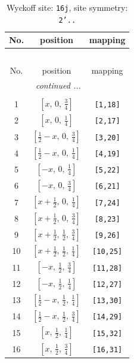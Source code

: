 \documentclass[fleqn,8pt]{jsarticle}
\begin{document}
\renewcommand{\arraystretch}{1.2}
\begin{longtable}{ccc}
\caption{Wyckoff site: {\tt 16j}, site symmetry: {\tt 2'..}}
 \\
 \hline \hline
No. & position & mapping \\ \hline \endfirsthead

\multicolumn{2}{l}{\tablename\ \thetable{}} \\
 \hline \hline
No. & position & mapping \\ \hline \endhead

 \hline \hline
\multicolumn{2}{r}{\footnotesize\it continued ...} \\ \endfoot

 \hline \hline
\multicolumn{2}{r}{} \\ \endlastfoot

1 & $\left[ x,\, 0,\, \frac{3}{4} \right]$ & {\tt [1,18]} \\ \hline
2 & $\left[ x,\, 0,\, \frac{1}{4} \right]$ & {\tt [2,17]} \\ \hline
3 & $\left[ \frac{1}{2} - x,\, 0,\, \frac{3}{4} \right]$ & {\tt [3,20]} \\ \hline
4 & $\left[ \frac{1}{2} - x,\, 0,\, \frac{1}{4} \right]$ & {\tt [4,19]} \\ \hline
5 & $\left[ - x,\, 0,\, \frac{1}{4} \right]$ & {\tt [5,22]} \\ \hline
6 & $\left[ - x,\, 0,\, \frac{3}{4} \right]$ & {\tt [6,21]} \\ \hline
7 & $\left[ x + \frac{1}{2},\, 0,\, \frac{1}{4} \right]$ & {\tt [7,24]} \\ \hline
8 & $\left[ x + \frac{1}{2},\, 0,\, \frac{3}{4} \right]$ & {\tt [8,23]} \\ \hline
9 & $\left[ x + \frac{1}{2},\, \frac{1}{2},\, \frac{3}{4} \right]$ & {\tt [9,26]} \\ \hline
10 & $\left[ x + \frac{1}{2},\, \frac{1}{2},\, \frac{1}{4} \right]$ & {\tt [10,25]} \\ \hline
11 & $\left[ - x,\, \frac{1}{2},\, \frac{3}{4} \right]$ & {\tt [11,28]} \\ \hline
12 & $\left[ - x,\, \frac{1}{2},\, \frac{1}{4} \right]$ & {\tt [12,27]} \\ \hline
13 & $\left[ \frac{1}{2} - x,\, \frac{1}{2},\, \frac{1}{4} \right]$ & {\tt [13,30]} \\ \hline
14 & $\left[ \frac{1}{2} - x,\, \frac{1}{2},\, \frac{3}{4} \right]$ & {\tt [14,29]} \\ \hline
15 & $\left[ x,\, \frac{1}{2},\, \frac{1}{4} \right]$ & {\tt [15,32]} \\ \hline
16 & $\left[ x,\, \frac{1}{2},\, \frac{3}{4} \right]$ & {\tt [16,31]} \\
\end{longtable}
\end{document}
